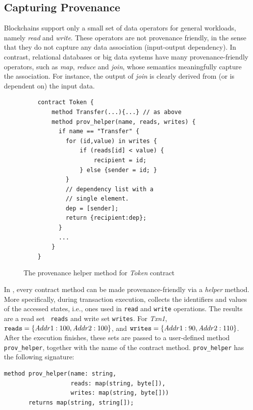 \subsection{Capturing Provenance}
Blockchains support only a small set of data operators for general workloads, namely \textit{read} and \textit{write}. These operators are not provenance friendly, in the sense that they do not capture any data
association (input-output dependency). In contrast, relational databases or big data systems have many
provenance-friendly operators, such as \textit{map}, \textit{reduce} and \textit{join}, whose semantics meaningfully
capture the association. For instance, the output of \textit{join} is clearly derived from (or is dependent on)
the input data.  

\begin{figure}
    \footnotesize
    \centering
    \begin{verbatim}
    contract Token {
        method Transfer(...){...} // as above
        method prov_helper(name, reads, writes) {
          if name == "Transfer" {
            for (id,value) in writes {
                if (reads[id] < value) {
                    recipient = id;
                } else {sender = id; }
            }
            // dependency list with a 
            // single element. 
            dep = [sender];  
            return {recipient:dep};
          } 
          ...
        }
    }
    \end{verbatim}
    \caption{The provenance helper method for \textit{Token} contract}
    \label{code:prov:helper_contract}
\end{figure}


In {\fs}, every contract method can be made provenance-friendly via a {\em helper} method.  
More specifically, during transaction execution, {\fs} collects the identifiers and values of the
accessed states, i.e., ones used in \texttt{read} and \texttt{write} operations. The results are a read set \texttt{ 
reads} and write set \texttt{writes}. For {\em Txn1}, ${\texttt{reads}} = \{{\textit Addr1}: 100, {\textit Addr2}:
100\}$, and ${\texttt{writes}} = \{{\textit Addr1}: 90, {\textit Addr2}: 110\}$. After the execution finishes,
these sets are passed to a user-defined method \texttt{prov\_helper}, together with the name of the contract
method. \texttt{prov\_helper} has the following signature:
\begin{verbatim}
method prov_helper(name: string,
                   reads: map(string, byte[]), 
                   writes: map(string, byte[])) 
       returns map(string, string[]);
\end{verbatim}

